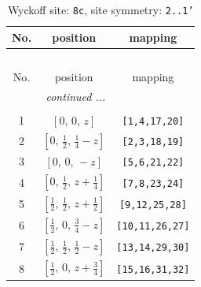 \documentclass[fleqn,8pt]{jsarticle}
\begin{document}
\renewcommand{\arraystretch}{1.2}
\begin{longtable}{ccc}
\caption{Wyckoff site: {\tt 8c}, site symmetry: {\tt 2..1'}}
 \\
 \hline \hline
No. & position & mapping \\ \hline \endfirsthead

\multicolumn{2}{l}{\tablename\ \thetable{}} \\
 \hline \hline
No. & position & mapping \\ \hline \endhead

 \hline \hline
\multicolumn{2}{r}{\footnotesize\it continued ...} \\ \endfoot

 \hline \hline
\multicolumn{2}{r}{} \\ \endlastfoot

1 & $\left[ 0,\, 0,\, z \right]$ & {\tt [1,4,17,20]} \\ \hline
2 & $\left[ 0,\, \frac{1}{2},\, \frac{1}{4} - z \right]$ & {\tt [2,3,18,19]} \\ \hline
3 & $\left[ 0,\, 0,\, - z \right]$ & {\tt [5,6,21,22]} \\ \hline
4 & $\left[ 0,\, \frac{1}{2},\, z + \frac{1}{4} \right]$ & {\tt [7,8,23,24]} \\ \hline
5 & $\left[ \frac{1}{2},\, \frac{1}{2},\, z + \frac{1}{2} \right]$ & {\tt [9,12,25,28]} \\ \hline
6 & $\left[ \frac{1}{2},\, 0,\, \frac{3}{4} - z \right]$ & {\tt [10,11,26,27]} \\ \hline
7 & $\left[ \frac{1}{2},\, \frac{1}{2},\, \frac{1}{2} - z \right]$ & {\tt [13,14,29,30]} \\ \hline
8 & $\left[ \frac{1}{2},\, 0,\, z + \frac{3}{4} \right]$ & {\tt [15,16,31,32]} \\
\end{longtable}
\renewcommand{\arraystretch}{1.2}
\end{document}
